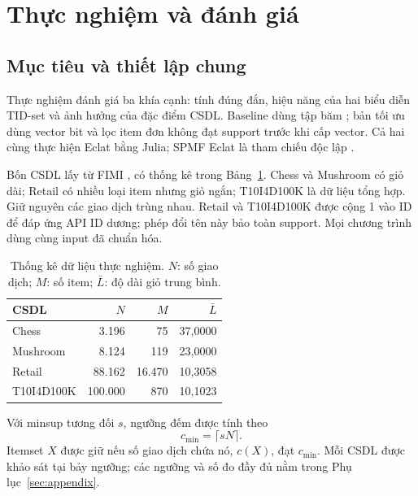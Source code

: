 \section{Thực nghiệm và đánh giá}\label{sec:benchmark}
\subsection{Mục tiêu và thiết lập chung}
Thực nghiệm đánh giá ba khía cạnh: tính đúng đắn, hiệu năng của hai biểu diễn
TID-set và ảnh hưởng của đặc điểm CSDL. Baseline dùng tập băm \st{};
bản tối ưu dùng vector bit \bv{} và lọc item đơn không đạt support trước khi
cấp vector. Cả hai cùng thực hiện Eclat bằng Julia; SPMF Eclat là tham chiếu
độc lập \cite{zaki,spmf}.

Bốn CSDL lấy từ FIMI \cite{fimi}, có thống kê trong Bảng~\ref{tab:data}.
Chess và Mushroom có giỏ dài; Retail có nhiều loại item nhưng giỏ ngắn;
T10I4D100K là dữ liệu tổng hợp. Giữ nguyên các giao dịch trùng nhau.
Retail và T10I4D100K được cộng 1 vào ID để đáp ứng API ID dương; phép đổi
tên này bảo toàn support. Mọi chương trình dùng cùng input đã chuẩn hóa.

\begin{table}[!ht]
\caption{Thống kê dữ liệu thực nghiệm. $N$: số giao dịch; $M$: số item;
$\bar L$: độ dài giỏ trung bình.}\label{tab:data}
\centering\small
\begin{tabular}{lrrr}\toprule CSDL & $N$ & $M$ & $\bar L$\\\midrule
Chess & 3.196 & 75 & 37,0000\\
Mushroom & 8.124 & 119 & 23,0000\\
Retail & 88.162 & 16.470 & 10,3058\\
T10I4D100K & 100.000 & 870 & 10,1023\\\bottomrule
\end{tabular}\end{table}

Với minsup tương đối $s$, ngưỡng đếm được tính theo
\begin{equation}c_{\min}=\lceil sN\rceil.\label{eq:threshold}\end{equation}
Itemset $X$ được giữ nếu số giao dịch chứa nó, $c(X)$, đạt $c_{\min}$.
Mỗi CSDL được khảo sát tại bảy ngưỡng; các ngưỡng và số đo đầy đủ nằm
trong Phụ lục~\ref{sec:appendix}.

